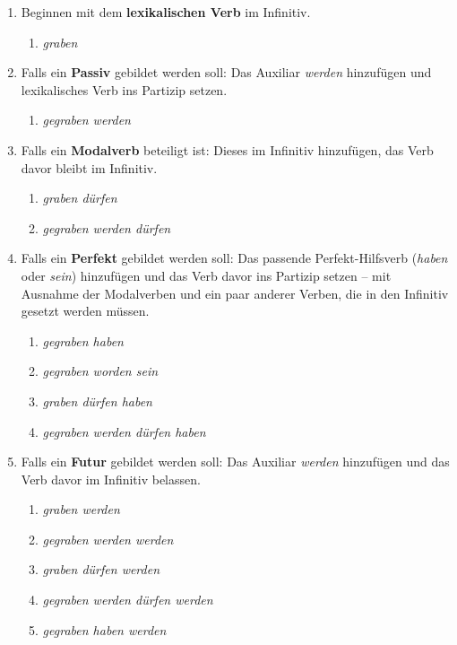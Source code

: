 \begin{enumerate}
  \item Beginnen mit dem \textbf{lexikalischen Verb} im Infinitiv.
    \begin{enumerate}
      \item \textit{graben}
    \end{enumerate} 
  \item Falls ein \textbf{Passiv} gebildet werden soll: Das Auxiliar \textit{werden} hinzufügen und lexikalisches Verb ins Partizip setzen.
    \begin{enumerate}
      \item \textit{gegraben werden}
    \end{enumerate}
  \item Falls ein \textbf{Modalverb} beteiligt ist: Dieses im Infinitiv hinzufügen, das Verb davor bleibt im Infinitiv.
    \begin{enumerate}
      \item \textit{graben dürfen}
      \item \textit{gegraben werden dürfen}
    \end{enumerate} 
  \item Falls ein \textbf{Perfekt} gebildet werden soll: Das passende Perfekt-Hilfsverb (\textit{haben} oder \textit{sein}) hinzufügen und das Verb davor ins Partizip setzen -- mit Ausnahme der Modalverben und ein paar anderer Verben, die in den Infinitiv gesetzt werden müssen.
    \begin{enumerate}
      \item \textit{gegraben haben}
      \item \textit{gegraben worden sein}
      \item \textit{graben dürfen haben}
      \item \textit{gegraben werden dürfen haben}
    \end{enumerate} 
  \item Falls ein \textbf{Futur} gebildet werden soll: Das Auxiliar \textit{werden} hinzufügen und das Verb davor im Infinitiv belassen.
    \begin{enumerate}
      \item \textit{graben werden}
      \item \textit{gegraben werden werden}
      \item \textit{graben dürfen werden}
      \item \textit{gegraben werden dürfen werden}
      \item \textit{gegraben haben werden}

\end{enumerate}
\end{enumerate}

